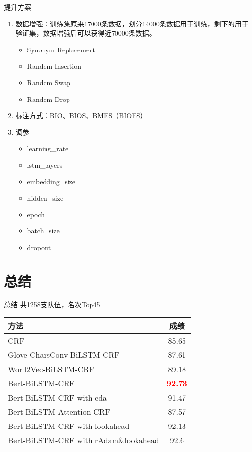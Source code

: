 \documentclass[9pt,aspectratio=169]{ctexbeamer}
\begin{document}
	\begin{frame}{提升方案}
		\begin{enumerate}
			\item 数据增强：训练集原来17000条数据，划分14000条数据用于训练，剩下的用于验证集，数据增强后可以获得近70000条数据。
			\begin{itemize}
				\item Synonym Replacement
				\item  Random Insertion
				\item Random Swap
				\item Random Drop
			\end{itemize}
			\item 标注方式：BIO、BIOS、BMES（BIOES）
			\item 调参
			\begin{itemize}
				\item learning\_rate
				\item lstm\_layers
				\item embedding\_size
				\item hidden\_size
				\item epoch
				\item batch\_size
				\item dropout
			\end{itemize}
		\end{enumerate}
		
	\end{frame}
	
	\section{总结}
	\begin{frame}{总结}
		共1258支队伍，名次Top45
		\begin{table}[]
			\begin{tabular}{lc}
				\hline
				方法               & 成绩   \\
				\hline
				CRF         & 85.65 \\
				
				Glove-CharsConv-BiLSTM-CRF & 87.61\\
				Word2Vec-BiLSTM-CRF         & 89.18              \\
				Bert-BiLSTM-CRF          & \bfseries \textcolor{red}{92.73}                        \\
				Bert-BiLSTM-CRF with eda	& 91.47 \\
				Bert-BiLSTM-Attention-CRF & 87.57 \\
				Bert-BiLSTM-CRF with lookahead & 92.13 \\
				Bert-BiLSTM-CRF with rAdam\&lookahead & 92.6 \\
				\hline
				
			\end{tabular}
		\end{table}
	\end{frame}
\end{document}

